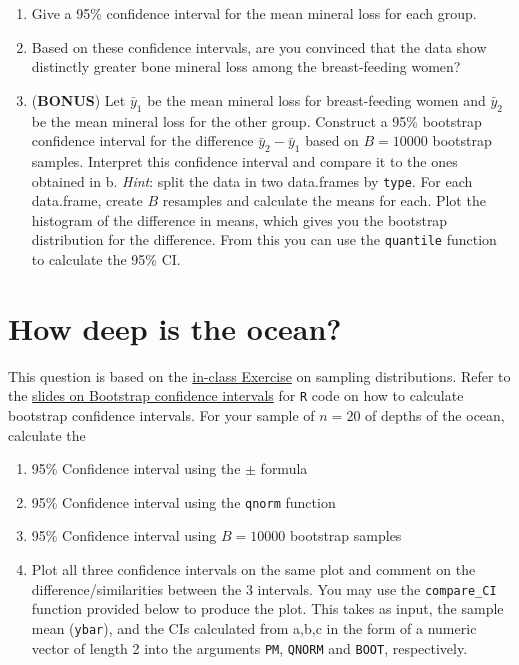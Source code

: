 \documentclass[letterpaper,9pt,twoside,printwatermark=false]{pinp}
\providecommand{\tightlist}{%
  \setlength{\itemsep}{0pt}\setlength{\parskip}{0pt}}
\begin{document}
\begin{enumerate}
\def\labelenumi{\alph{enumi}.}
\tightlist
\item
  Give a 95\% confidence interval for the mean mineral loss for each
  group.
\item
  Based on these confidence intervals, are you convinced that the data
  show distinctly greater bone mineral loss among the breast-feeding
  women?
\item
  (\textbf{BONUS}) Let \(\bar{y}_1\) be the mean mineral loss for
  breast-feeding women and \(\bar{y}_2\) be the mean mineral loss for
  the other group. Construct a 95\% bootstrap confidence interval for
  the difference \(\bar{y}_2 - \bar{y}_1\) based on \(B=10000\)
  bootstrap samples. Interpret this confidence interval and compare it
  to the ones obtained in b. \emph{Hint}: split the data in two
  data.frames by \texttt{type}. For each data.frame, create \(B\)
  resamples and calculate the means for each. Plot the histogram of the
  difference in means, which gives you the bootstrap distribution for
  the difference. From this you can use the \texttt{quantile} function
  to calculate the 95\% CI.
\end{enumerate}

\section{How deep is the ocean?}\label{how-deep-is-the-ocean}

This question is based on the
\href{https://github.com/sahirbhatnagar/EPIB607/blob/master/exercises/water/students/260194225_water_exercise_epib607.pdf}{in-class
Exercise} on sampling distributions. Refer to the
\href{https://github.com/sahirbhatnagar/EPIB607/raw/master/slides/bootstrap/EPIB607_bootstrap.pdf}{slides
on Bootstrap confidence intervals} for \texttt{R} code on how to
calculate bootstrap confidence intervals. For your sample of \(n=20\) of
depths of the ocean, calculate the

\begin{enumerate}
\def\labelenumi{\alph{enumi}.}
\tightlist
\item
  95\% Confidence interval using the \(\pm\) formula
\item
  95\% Confidence interval using the \texttt{qnorm} function
\item
  95\% Confidence interval using \(B=10000\) bootstrap samples
\item
  Plot all three confidence intervals on the same plot and comment on
  the difference/similarities between the 3 intervals. You may use the
  \texttt{compare\_CI} function provided below to produce the plot. This
  takes as input, the sample mean (\texttt{ybar}), and the CIs
  calculated from a,b,c in the form of a numeric vector of length 2 into
  the arguments \texttt{PM}, \texttt{QNORM} and \texttt{BOOT},
  respectively.
\end{enumerate}
\end{document}
